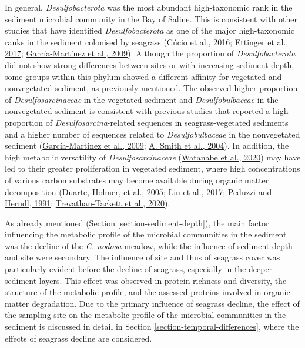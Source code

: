 \documentclass[
  12 pt,
]{book}
\begin{document}
In general, \emph{Desulfobacterota} was the most abundant high-taxonomic rank in the sediment microbial community in the Bay of Saline. This is consistent with other studies that have identified \emph{Desulfobacterota} as one of the major high-taxonomic ranks in the sediment colonised by seagrass (\protect\hyperlink{ref-Cucio2016}{Cúcio et al., 2016}; \protect\hyperlink{ref-Ettinger2017}{Ettinger et al., 2017}; \protect\hyperlink{ref-Garcia-Martinez2009}{García-Martínez et al., 2009}). Although the proportion of \emph{Desulfobacterota} did not show strong differences between sites or with increasing sediment depth, some groups within this phylum showed a different affinity for vegetated and nonvegetated sediment, as previously mentioned. The observed higher proportion of \emph{Desulfosarcinaceae} in the vegetated sediment and \emph{Desulfobulbaceae} in the nonvegetated sediment is consistent with previous studies that reported a high proportion of \emph{Desulfosarcina}-related sequences in seagrass-vegetated sediments and a higher number of sequences related to \emph{Desulfobulbaceae} in the nonvegetated sediment (\protect\hyperlink{ref-Garcia-Martinez2009}{García-Martínez et al., 2009}; \protect\hyperlink{ref-Smith2004}{A. Smith et al., 2004}). In addition, the high metabolic versatility of \emph{Desulfosarcinaceae} (\protect\hyperlink{ref-Watanabe2020}{Watanabe et al., 2020}) may have led to their greater proliferation in vegetated sediment, where high concentrations of various carbon substrates may become available during organic matter decomposition (\protect\hyperlink{ref-Duarte2005}{Duarte, Holmer, et al., 2005}; \protect\hyperlink{ref-Liu2017}{Liu et al., 2017}; \protect\hyperlink{ref-Peduzzi1991}{Peduzzi and Herndl, 1991}; \protect\hyperlink{ref-Trevathan-Tackett2020}{Trevathan-Tackett et al., 2020}).

As already mentioned (Section \ref{section-sediment-depth}), the main factor influencing the metabolic profile of the microbial communities in the sediment was the decline of the \emph{C. nodosa} meadow, while the influence of sediment depth and site were secondary. The influence of site and thus of seagrass cover was particularly evident before the decline of seagrass, especially in the deeper sediment layers. This effect was observed in protein richness and diversity, the structure of the metabolic profile, and the assessed proteins involved in organic matter degradation. Due to the primary influence of seagrass decline, the effect of the sampling site on the metabolic profile of the microbial communities in the sediment is discussed in detail in Section \ref{section-temporal-differences}, where the effects of seagrass decline are considered.
\end{document}
